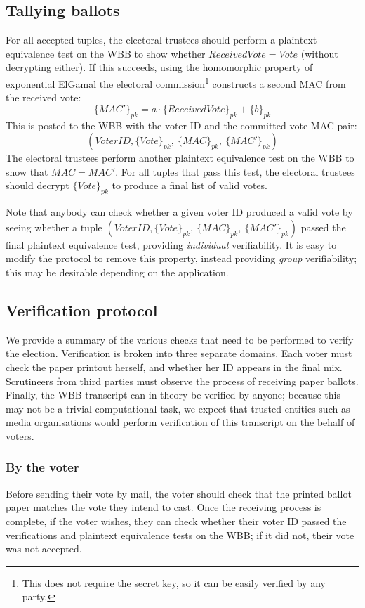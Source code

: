 \documentclass[11pt,twoside,a4paper]{article}
\theoremstyle{definition}
\begin{document}
\subsection{Tallying ballots}
For all accepted tuples, the electoral trustees should perform a plaintext equivalence test on the WBB to show whether \(ReceivedVote=Vote\) (without decrypting either). If this succeeds, using the homomorphic property of exponential ElGamal the electoral commission\footnote{This does not require the secret key, so it can be easily verified by any party.} constructs a second MAC from the received vote:
\[\{MAC'\}_{pk}=a\cdot\{ReceivedVote\}_{pk}+\{b\}_{pk}\]
This is posted to the WBB with the voter ID and the committed vote-MAC pair:
\[\left(VoterID, \{Vote\}_{pk},\ \{MAC\}_{pk},\ \{MAC'\}_{pk}\right)\]
The electoral trustees perform another plaintext equivalence test on the WBB to show that \(MAC=MAC'\). For all tuples that pass this test, the electoral trustees should decrypt \(\{Vote\}_{pk}\) to produce a final list of valid votes.

Note that anybody can check whether a given voter ID produced a valid vote by seeing whether a tuple \(\left(VoterID, \{Vote\}_{pk},\ \{MAC\}_{pk},\ \{MAC'\}_{pk}\right)\) passed the final plaintext equivalence test, providing \textit{individual} verifiability. It is easy to modify the protocol to remove this property, instead providing \textit{group} verifiability; this may be desirable depending on the application.
\subsection{Verification protocol}
We provide a summary of the various checks that need to be performed to verify the election. Verification is broken into three separate domains. Each voter must check the paper printout herself, and whether her ID appears in the final mix. Scrutineers from third parties must observe the process of receiving paper ballots. Finally, the WBB transcript can in theory be verified by anyone; because this may not be a trivial computational task, we expect that trusted entities such as media organisations would perform verification of this transcript on the behalf of voters.

\subsubsection{By the voter}
Before sending their vote by mail, the voter should check that the printed ballot paper matches the vote they intend to cast. Once the receiving process is complete, if the voter wishes, they can check whether their voter ID passed the verifications and plaintext equivalence tests on the WBB; if it did not, their vote was not accepted.
\end{document}
